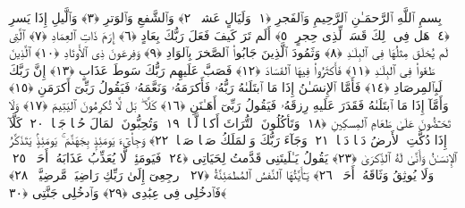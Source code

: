 
  
    
  
    
    

\nopagebreak
  بِسمِ ٱللَّهِ ٱلرَّحمَـٰنِ ٱلرَّحِيمِ
  وَٱلفَجرِ ﴿١﴾
 وَلَيَالٍ عَشرٍۢ ﴿٢﴾
 وَٱلشَّفعِ وَٱلوَترِ ﴿٣﴾
 وَٱلَّيلِ إِذَا يَسرِ ﴿٤﴾
 هَل فِى ذَٟلِكَ قَسَمٌۭ لِّذِى حِجرٍ ﴿٥﴾
 أَلَم تَرَ كَيفَ فَعَلَ رَبُّكَ بِعَادٍ ﴿٦﴾
 إِرَمَ ذَاتِ ٱلعِمَادِ ﴿٧﴾
 ٱلَّتِى لَم يُخلَق مِثلُهَا فِى ٱلبِلَـٰدِ ﴿٨﴾
 وَثَمُودَ ٱلَّذِينَ جَابُوا۟ ٱلصَّخرَ بِٱلوَادِ ﴿٩﴾
 وَفِرعَونَ ذِى ٱلأَوتَادِ ﴿١٠﴾
 ٱلَّذِينَ طَغَوا۟ فِى ٱلبِلَـٰدِ ﴿١١﴾
 فَأَكثَرُوا۟ فِيهَا ٱلفَسَادَ ﴿١٢﴾
 فَصَبَّ عَلَيهِم رَبُّكَ سَوطَ عَذَابٍ ﴿١٣﴾
 إِنَّ رَبَّكَ لَبِٱلمِرصَادِ ﴿١٤﴾
 فَأَمَّا ٱلإِنسَـٰنُ إِذَا مَا ٱبتَلَىٰهُ رَبُّهُۥ فَأَكرَمَهُۥ وَنَعَّمَهُۥ فَيَقُولُ رَبِّىٓ أَكرَمَنِ ﴿١٥﴾
 وَأَمَّآ إِذَا مَا ٱبتَلَىٰهُ فَقَدَرَ عَلَيهِ رِزقَهُۥ فَيَقُولُ رَبِّىٓ أَهَـٰنَنِ ﴿١٦﴾
 كَلَّا ۖ بَل لَّا تُكرِمُونَ ٱليَتِيمَ ﴿١٧﴾
 وَلَا تَحَـٰٓضُّونَ عَلَىٰ طَعَامِ ٱلمِسكِينِ ﴿١٨﴾
 وَتَأكُلُونَ ٱلتُّرَاثَ أَكلًۭا لَّمًّۭا ﴿١٩﴾
 وَتُحِبُّونَ ٱلمَالَ حُبًّۭا جَمًّۭا ﴿٢٠﴾
 كَلَّآ إِذَا دُكَّتِ ٱلأَرضُ دَكًّۭا دَكًّۭا ﴿٢١﴾
 وَجَآءَ رَبُّكَ وَٱلمَلَكُ صَفًّۭا صَفًّۭا ﴿٢٢﴾
 وَجِا۟ىٓءَ يَومَئِذٍۭ بِجَهَنَّمَ ۚ يَومَئِذٍۢ يَتَذَكَّرُ ٱلإِنسَـٰنُ وَأَنَّىٰ لَهُ ٱلذِّكرَىٰ ﴿٢٣﴾
 يَقُولُ يَـٰلَيتَنِى قَدَّمتُ لِحَيَاتِى ﴿٢٤﴾
 فَيَومَئِذٍۢ لَّا يُعَذِّبُ عَذَابَهُۥٓ أَحَدٌۭ ﴿٢٥﴾
 وَلَا يُوثِقُ وَثَاقَهُۥٓ أَحَدٌۭ ﴿٢٦﴾
 يَـٰٓأَيَّتُهَا ٱلنَّفسُ ٱلمُطمَئِنَّةُ ﴿٢٧﴾
 ٱرجِعِىٓ إِلَىٰ رَبِّكِ رَاضِيَةًۭ مَّرضِيَّةًۭ ﴿٢٨﴾
 فَٱدخُلِى فِى عِبَٰدِى ﴿٢٩﴾
 وَٱدخُلِى جَنَّتِى ﴿٣٠﴾
 
